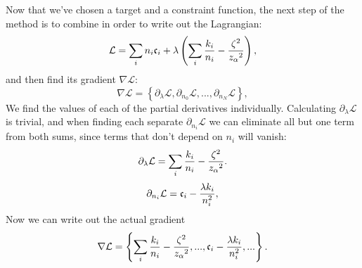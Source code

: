 Now that we've chosen a target and a constraint function, the next step of the method is to combine  in order to write out the Lagrangian:
    \begin{equation}
    \label{eq:optimization_lagrangian}
    	\mathcal{L}=\sum _i n_i \mathfrak{c}_{i} + \lambda \left(\sum _i \frac{k_i}{n_i} - \frac{\zeta {}^2}{z_{\alpha} {}^2}\right),
    \end{equation}
and then find its gradient $\nabla \mathcal{L}$:
    \begin{equation*}
        \nabla \mathcal{L}=\left\{ \partial_{\lambda} \mathcal{L}, \partial_{n_0} \mathcal{L}, \text{...}, \partial_{n_N} \mathcal{L} \right\},
    \end{equation*}
We find the values of each of the partial derivatives individually. Calculating $\partial_{\lambda} \mathcal{L}$ is trivial, and when finding each separate $\partial_{n_i} \mathcal{L}$ we can eliminate all but one term from both sums, since terms that don{'}t depend on $n_i$ will vanish:
    \begin{equation*}
    	\partial _{\lambda }\mathcal{L}=\sum _i \frac{k_i}{n_i}-\frac{\zeta {}^2}{z_{\alpha} {}^2}.
    \end{equation*}
    \begin{equation*}
    	\partial _{n_i}\mathcal{L}=\mathfrak{c}_{i}-\frac{\lambda  k_i}{n_i^2},
    \end{equation*}
Now we can write out the actual gradient
    \begin{equation}
    \label{eq:optimization_lagrangian_gradient}
    	\nabla \mathcal{L}=\left\{\sum _i \frac{k_i}{n_i}-\frac{\zeta {}^2}{z_{\alpha} {}^2},\text{...},\mathfrak{c}_{i}-\frac{\lambda  k_i}{n_i^2},\text{...}\right\}.
    \end{equation}

